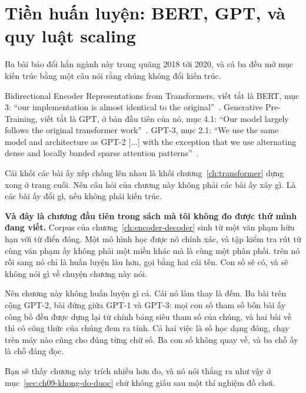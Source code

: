 \chapter{Tiền huấn luyện: BERT, GPT, và quy luật scaling}
\label{ch:tien-huan-luyen}

Ba bài báo đổi hẳn ngành này trong quãng 2018 tới 2020, và cả ba đều mở mục
kiến trúc bằng một câu nói rằng chúng không đổi kiến trúc.

Bidirectional Encoder Representations from Transformers, viết tắt là BERT, mục
3: \enquote{our implementation is almost identical to the
original}~\autocite{devlin2019bert}. Generative Pre-Training, viết tắt là GPT,
ở bản đầu tiên của nó, mục 4.1: \enquote{Our model largely follows the original
transformer work}~\autocite{radford2018gpt1}. GPT-3, mục 2.1: \enquote{We use the same model and architecture as GPT-2 [...] with the
exception that we use alternating dense and locally banded sparse attention
patterns}~\autocite{brown2020gpt3}.

Cái khối các bài ấy xếp chồng lên nhau là khối chương~\ref{ch:transformer} dựng
xong ở trang cuối. Nên câu hỏi của chương này không phải các bài ấy xây gì. Là
các bài ấy đổi gì, nếu không phải kiến trúc.

\textbf{Và đây là chương đầu tiên trong sách mà tôi không đo được thứ mình đang
viết.} Corpus của chương~\ref{ch:encoder-decoder} sinh từ một văn phạm hữu hạn
với từ điển đóng. Một mô hình học được nó chính xác, và tập kiểm tra rút từ cùng
văn phạm ấy không phải một miền khác mà là cùng một phân phối.  trên nó rồi  sang nó chỉ là
huấn luyện lâu hơn, gọi bằng hai cái tên. Con số sẽ có, và sẽ không nói gì về
chuyện chương này nói.

Nên chương này không huấn luyện gì cả. Cái nó làm thay là đếm. Ba bài trên cộng
GPT-2, bài đứng giữa GPT-1 và GPT-3: mọi con số tham số bốn bài ấy công bố đều
được dựng lại từ chính bảng siêu tham số của chúng, và hai bài về
 thì có công thức của chúng đem ra tính. Cả hai việc là số học dạng đóng, chạy trên máy nào cũng cho
đúng từng chữ số. Ba con số không quay về, và ba chỗ ấy là chỗ đáng đọc.

Bạn sẽ thấy chương này trích nhiều hơn đo, và nó nói thẳng ra như vậy ở
mục~\ref{sec:ch09-khong-do-duoc} chứ không giấu sau một thí nghiệm đồ chơi.








